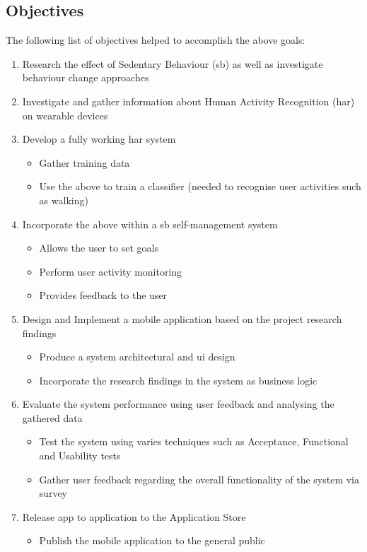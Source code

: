     \subsection*{Objectives}
    The following list of objectives helped to accomplish the above goals: 
    \begin{enumerate}
        \item Research the effect of Sedentary Behaviour (\gls{sb}) as well as investigate behaviour change approaches
        \item Investigate and gather information about Human Activity Recognition (\gls{har}) on wearable devices
        \item Develop a fully working \gls{har} system
        \begin{itemize}
            \item Gather training data
            \item Use the above to train a classifier (needed to recognise user activities such as walking)  
        \end{itemize}
        \item Incorporate the above within a \gls{sb} self-management system
        \begin{itemize}
            \item Allows the user to set goals
            \item Perform user activity monitoring
            \item Provides feedback to the user
        \end{itemize}
        \item  Design and Implement a mobile application based on the project research findings
        \begin{itemize}
            \item Produce a system architectural and \gls{ui} design
            \item Incorporate the research findings in the system as business logic 
        \end{itemize}
        \item Evaluate the system performance using user feedback and analysing the gathered data
        \begin{itemize}
            \item Test the system using varies techniques such as Acceptance, Functional and Usability tests
            \item Gather user feedback regarding the overall functionality of the system via survey
        \end{itemize}
        \item Release app to application to the Application Store 
        \begin{itemize}
            \item Publish the mobile application to the general public
        \end{itemize}
    \end{enumerate}
    
